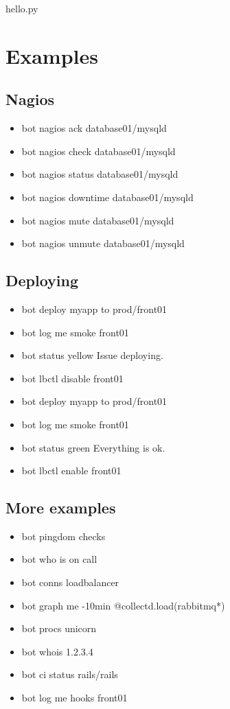 \documentclass[
paper=128mm:96mm, %
fontsize=11pt, %
pagesize, %
parskip=half-, %
]{scrartcl} %
\theoremstyle{mythmstyle} %
\begin{document}
hello.py
\clearpage


\section{Examples}
\subsection{Nagios}
\begin{itemize}
  \item bot nagios ack database01/mysqld
  \item bot nagios check database01/mysqld
  \item bot nagios status database01/mysqld
  \item bot nagios downtime database01/mysqld
  \item bot nagios mute database01/mysqld
  \item bot nagios unmute database01/mysqld
\end{itemize}
\clearpage


\subsection{Deploying}
\begin{itemize}
  \item bot deploy myapp to prod/front01
  \item bot log me smoke front01
  \item bot status yellow Issue deploying.
  \item bot lbctl disable front01
  \item bot deploy myapp to prod/front01
  \item bot log me smoke front01
  \item bot status green Everything is ok.
  \item bot lbctl enable front01
\end{itemize}
\clearpage


\subsection{More examples}
\begin{itemize}
\item bot pingdom checks
\item bot who is on call
\item bot conns loadbalancer
\item bot graph me -10min @collectd.load(rabbitmq*)
\item bot procs unicorn
\item bot whois 1.2.3.4
\item bot ci status rails/rails
\item bot log me hooks front01
\end{itemize}
\end{document}
